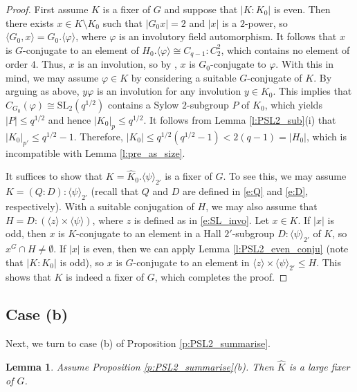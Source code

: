 \documentclass[twoside,a4paper,reqno,11pt]{amsart}
\newcommand{\<}{\langle}
\renewcommand{\>}{\rangle}
\newcommand{\la}{\langle}
\newcommand{\ra}{\rangle}
\newcommand{\leqs}{\leqslant}
\newcommand{\SL}{\mathrm{SL}}
\newtheorem{lem}[thm]{Lemma}
\theoremstyle{definition}
\begin{document}
	\begin{proof}
		First assume $K$ is a fixer of $G$ and suppose that $|K:K_0|$ is even. Then there exists $x\in K\setminus K_0$ such that $|G_0x| = 2$ and $|x|$ is a $2$-power, so $\la G_0,x\ra = G_0.\la \varphi\ra$, where $\varphi$ is an involutory field automorphism. It follows that $x$ is $G$-conjugate to an element of $H_0.\la\varphi\ra\cong C_{q-1}{:}C_2^2$, which contains no element of order $4$. Thus, $x$ is an involution, so by \cite[Proposition 4.9.1(d)]{GLS_CFSG3}, $x$ is $G_0$-conjugate to $\varphi$. With this in mind, we may assume $\varphi\in K$ by considering a suitable $G$-conjugate of $K$. By arguing as above, $y\varphi$ is an involution for any involution $y\in K_0$. This implies that $C_{G_0}(\varphi)\cong \SL_2(q^{1/2})$ contains a Sylow $2$-subgroup $P$ of $K_0$, which yields $|P|\leqs q^{1/2}$ and hence $|K_0|_p\leqs q^{1/2}$. It follows from Lemma \ref{l:PSL2_sub}(i) that $|K_0|_{p'}\leqs q^{1/2}-1$. Therefore, $|K_0|\leqs q^{1/2}(q^{1/2}-1) < 2(q-1) = |H_0|$, which is incompatible with Lemma \ref{l:pre_as_size}.
		
		It suffices to show that $K = \widehat{K}_0.\la\psi\ra_{2'}$ is a fixer of $G$. To see this, we may assume $K = (Q{:}D){:}\la\psi\ra_{2'}$ (recall that $Q$ and $D$ are defined in \eqref{e:Q} and \eqref{e:D}, respectively). With a suitable conjugation of $H$, we may also assume that $H = D{:}(\la z\ra\times\la\psi\ra)$, where $z$ is defined as in \eqref{e:SL_invo}. Let $x\in K$. If $|x|$ is odd, then $x$ is $K$-conjugate to an element in a Hall $2'$-subgroup $D{:}\la\psi\ra_{2'}$ of $K$, so $x^G\cap H\ne \emptyset$. If $|x|$ is even, then we can apply Lemma \ref{l:PSL2_even_conju} (note that $|K:K_0|$ is odd), so $x$ is $G$-conjugate to an element in $\la z\ra\times\la\psi\ra_{2'}\leqs H$. This shows that $K$ is indeed a fixer of $G$, which completes the proof.
	\end{proof}
	
	
	
	\subsection{Case (b)}
	
	Next, we turn to case (b) of Proposition \ref{p:PSL2_summarise}.
	
	\begin{lem}
		\label{l:PSL2_(b)}
		Assume Proposition \ref{p:PSL2_summarise}(b). Then $\widehat{K}$ is a large fixer of $G$.
	\end{lem}
	
\end{document}
